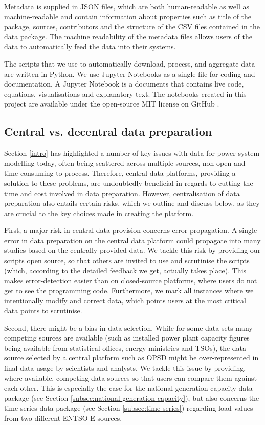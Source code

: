 \documentclass[article,sort&compress]{elsarticle}
\begin{document}
Metadata is supplied in JSON files, which are both human-readable as well as machine-readable and contain information about properties such as title of the package, sources, contributors and the structure of the CSV files contained in the data package. The machine readability of the metadata files allows users of the data to automatically feed the data into their systems. 

The scripts that we use to automatically download, process, and aggregate data are written in Python. We use Jupyter Notebooks as a single file for coding and documentation. A Jupyter Notebook is a documents that contains live code, equations, visualisations and explanatory text. The notebooks created in this project are available under the open-source MIT license on GitHub \cite{OPSDgithub}.



\subsection{Central vs. decentral data preparation}

Section \ref{intro} has highlighted a number of key issues with data for power system modelling today, often being scattered across multiple sources, non-open and time-consuming to process. Therefore, central data platforms, providing a solution to these problems, are undoubtedly beneficial in regards to cutting the time and cost involved in data preparation. However, centralisation of data preparation also entails certain risks, which we outline and discuss below, as they are crucial to the key choices made in creating the platform.

First, a major risk in central data provision concerns error propagation. A single error in data preparation on the central data platform could propagate into many studies based on the centrally provided data. We tackle this risk by providing our scripts open source, so that others are invited to use and scrutinise the scripts (which, according to the detailed feedback we get, actually takes place). This makes error-detection easier than on closed-source platforms, where users do not get to see the programming code. Furthermore, we mark all instances where we intentionally modify and correct data, which points users at the most critical data points to scrutinise.

Second, there might be a bias in data selection. While for some data sets many competing sources are available (such as installed power plant capacity figures being available from statistical offices, energy ministries and TSOs), the data source selected by a central platform such as OPSD might be over-represented in final data usage by scientists and analysts. We tackle this issue by providing, where available, competing data sources so that users can compare them against each other. This is especially the case for the national generation capacity data package (see Section \ref{subsec:national generation capacity}), but also concerns the time series data package (see Section \ref{subsec:time series}) regarding load values from two different ENTSO-E sources.
\end{document}
